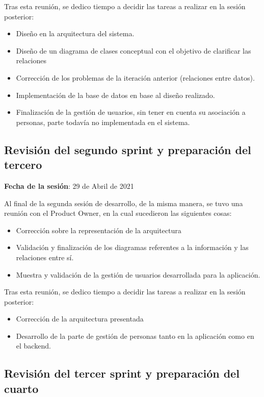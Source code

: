 Tras esta reunión, se dedico tiempo a decidir las tareas a realizar en la sesión posterior:

\begin{itemize}
    \item Diseño en la arquitectura del sistema.
    \item Diseño de un diagrama de clases conceptual con el objetivo de clarificar las relaciones
    \item Corrección de los problemas de la iteración anterior (relaciones entre datos).
    \item Implementación de la base de datos en base al diseño realizado.
    \item Finalización de la gestión de usuarios, sin tener en cuenta su asociación a personas, parte todavía no implementada en el sistema.
\end{itemize}

\subsection{Revisión del segundo sprint y preparación del tercero}

\textbf{Fecha de la sesión}: 29 de Abril de 2021

Al final de la segunda sesión de desarrollo, de la misma manera, se tuvo una reunión con el Product Owner, en la cual sucedieron las siguientes cosas: 

\begin{itemize}
    \item Corrección sobre la representación de la arquitectura
    \item Validación y finalización de los diagramas referentes a la información y las relaciones entre sí.
    \item Muestra y validación de la gestión de usuarios desarrollada para la aplicación. 
\end{itemize}

Tras esta reunión, se dedico tiempo a decidir las tareas a realizar en la sesión posterior:

\begin{itemize}
    \item Corrección de la arquitectura presentada
    \item Desarrollo de la parte de gestión de personas tanto en la aplicación como en el backend.
\end{itemize}

\subsection{Revisión del tercer sprint y preparación del cuarto}

